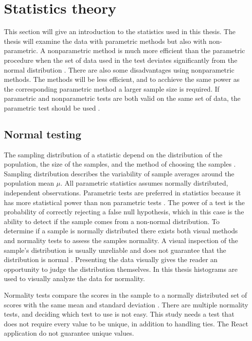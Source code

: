\section{Statistics theory}\label{sec:statistic_theory}
This section will give an introduction to the statistics used in this thesis. The thesis will examine the data with parametric methods but also with non-parametric. A nonparametric method is much more efficient than the parametric procedure when the set of data used in the test deviates significantly from the normal distribution \citep{Walpole2012}. There are also some disadvantages using nonparametric methods. The methods will be less efficient, and to acchieve the same power as the corresponding parametric method a larger sample size is required. If parametric and nonparametric tests are both valid on the same set of data, the parametric test should be used \citep{Walpole2012}. 

\subsection{Normal testing}\label{sec:normaltesting}
The sampling distribution of a statistic depend on the distribution of the population, the size of the samples, and the method of choosing the samples \citep{Walpole2012}. Sampling distribution describes the variability of sample averages around the population mean $\mu$. All parametric statistics assumes normally distributed, independent observations. Parametric tests are preferred in statistics because it has more statistical power than non parametric tests \citep{Frost2015}. The power of a test is the probability of correctly rejecting a false null hypothesis, which in this case is the ability to detect if the sample comes from a non-normal distribution. To determine if a sample is normally distributed there exists both visual methods and normality tests to assess the samples normality. A visual inspection of the sample's distribution is usually unreliable and does not guarantee that the distribution is normal \citep{Pearson2006}. Presenting the data visually gives the reader an opportunity to judge the distribution themselves. In this thesis histograms are used to visually analyze the data for normality. 

Normality tests compare the scores in the sample to a normally distributed set of scores with the same mean and standard deviation \citep{Ghasemi2012}. There are multiple normality tests, and deciding which test to use is not easy. This study needs a test that does not require every value to be unique, in addition to handling ties. The React application do not guarantee unique values. 

